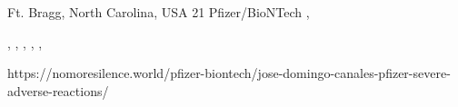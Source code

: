           {
            Ft. Bragg, North Carolina, USA
          }
          {
            21
          }
          {
            Pfizer/BioNTech
          }
          {
            ,
          }
          {
            ,
            ,
            ,
            ,
            ,
            
          }
          {
            https://nomoresilence.world/pfizer-biontech/jose-domingo-canales-pfizer-severe-adverse-reactions/
          }


